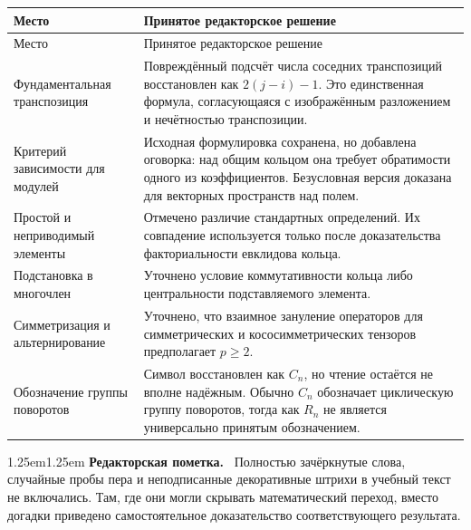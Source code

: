 \documentclass[12pt,a4paper,oneside,openany]{book}
\theoremstyle{definition}
\theoremstyle{plain}
\theoremstyle{remark}
\newenvironment{editorialnote}
  {\begin{adjustwidth}{1.25em}{1.25em}\small
   \noindent\textcolor{editorred}{\sffamily\bfseries Редакторская пометка.}\ }
  {\par\end{adjustwidth}}
\begin{document}
\begin{longtable}{@{}p{}p{}@{}}
\toprule
Место & Принятое редакторское решение \\
\midrule
\endfirsthead
\toprule
Место & Принятое редакторское решение \\
\midrule
\endhead
Фундаментальная транспозиция &
Повреждённый подсчёт числа соседних транспозиций восстановлен как
$2(j-i)-1$. Это единственная формула, согласующаяся с изображённым
разложением и нечётностью транспозиции. \\
Критерий зависимости для модулей &
Исходная формулировка сохранена, но добавлена оговорка: над общим кольцом
она требует обратимости одного из коэффициентов. Безусловная версия
доказана для векторных пространств над полем. \\
Простой и неприводимый элементы &
Отмечено различие стандартных определений. Их совпадение используется
только после доказательства факториальности евклидова кольца. \\
Подстановка в многочлен &
Уточнено условие коммутативности кольца либо центральности подставляемого
элемента. \\
Симметризация и альтернирование &
Уточнено, что взаимное зануление операторов для симметрических и
кососимметрических тензоров предполагает $p\ge2$. \\
Обозначение группы поворотов &
Символ восстановлен как $C_n$, но чтение остаётся не вполне надёжным.
Обычно $C_n$ обозначает циклическую группу поворотов, тогда как $R_n$ не
является универсально принятым обозначением. \\
\bottomrule
\end{longtable}

\begin{editorialnote}
Полностью зачёркнутые слова, случайные пробы пера и неподписанные
декоративные штрихи в учебный текст не включались. Там, где они могли
скрывать математический переход, вместо догадки приведено самостоятельное
доказательство соответствующего результата.
\end{editorialnote}
\end{document}
